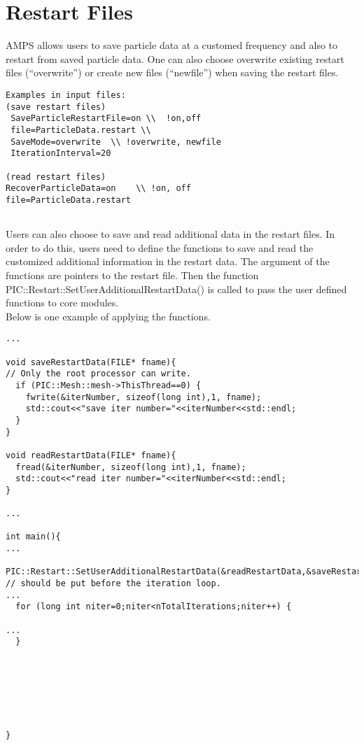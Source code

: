 \section {Restart Files}
AMPS allows users to save particle data at a customed frequency and also to restart from saved particle data. One can also choose overwrite existing restart files (``overwrite'') or create new files (``newfile'') when saving the restart files. \\
\begin{verbatim}
Examples in input files:
(save restart files)
 SaveParticleRestartFile=on \\  !on,off
 file=ParticleData.restart \\
 SaveMode=overwrite  \\ !overwrite, newfile
 IterationInterval=20

(read restart files)
RecoverParticleData=on    \\ !on, off
file=ParticleData.restart
 
\end{verbatim}
Users can also choose to save and read additional data in the restart files. In order to do this, users need to define the functions to save and read the customized additional information in the restart data. The argument of the functions are pointers to the restart file. Then the function PIC::Restart::SetUserAdditionalRestartData() is called to  pass the user defined functions to core modules. \\
Below is one example of applying the functions.
\begin{verbatim} 
...

void saveRestartData(FILE* fname){
// Only the root processor can write.
  if (PIC::Mesh::mesh->ThisThread==0) {
    fwrite(&iterNumber, sizeof(long int),1, fname);
    std::cout<<"save iter number="<<iterNumber<<std::endl;
  }
}

void readRestartData(FILE* fname){
  fread(&iterNumber, sizeof(long int),1, fname);
  std::cout<<"read iter number="<<iterNumber<<std::endl;
}

...

int main(){
...
 PIC::Restart::SetUserAdditionalRestartData(&readRestartData,&saveRestartData);         
// should be put before the iteration loop.
...
  for (long int niter=0;niter<nTotalIterations;niter++) {

...
  }







}

\end{verbatim}
